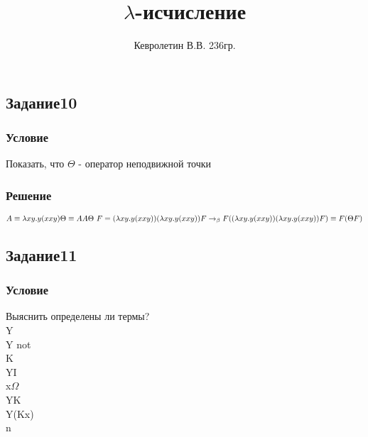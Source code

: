 \documentclass[10pt,a4paper]{article}
\author{Кевролетин В.В. 236гр.}
\title{$\lambda$-исчисление}
\begin{document}
\maketitle

\subsection*{Задание10}
\subsubsection*{Условие}
Показать, что $\Theta{}$ - оператор неподвижной точки 
\subsubsection*{Решение}

$A \equiv \lambda xy.y(xxy) \\
\Theta \equiv AA \\
\Theta \ F = (\lambda xy.y(xxy))(\lambda xy.y(xxy))F
\rightarrow_\beta 
F((\lambda xy.y(xxy))(\lambda xy.y(xxy))F) \equiv F (\Theta F) $

\subsection*{Задание11}
\subsubsection*{Условие}
Выяснить определены ли термы? \\
Y\\
Y not\\
K\\
YI\\
x$\Omega$\\
YK\\
Y(Kx)\\
n\\
\end{document}
